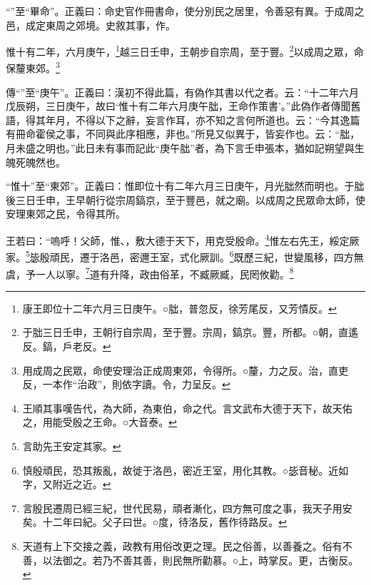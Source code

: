 {\noindent\shu{}\fzkt “”至“畢命”。正義曰：命史官作冊書命，使分別民之居里，令善惡有異。于成周之邑，成定東周之郊境。史敘其事，作。 \par}

惟十有二年，六月庚午，\footnote{康王即位十二年六月三日庚午。○朏，普忽反，徐芳尾反，又芳憒反。}越三日壬申，王朝步自宗周，至于豐。\footnote{于朏三日壬申，王朝行自宗周，至于豐。宗周，鎬京。豐，所都。○朝，直遙反。鎬，戶老反。}以成周之眾，命保釐東郊。\footnote{用成周之民眾，命使安理治正成周東郊，令得所。○釐，力之反。治，直吏反，一本作“治政”，則依字讀。令，力呈反。}


{\noindent\zhuan{}\fzbyks 傳“”至“庚午”。正義曰：漢初不得此篇，有偽作其書以代之者。云：“十二年六月戊辰朔，三日庚午，故曰‘惟十有二年六月庚午朏，王命作策書’。”此偽作者傳聞舊語，得其年月，不得以下之辭，妄言作耳，亦不知之言何所道也。云：“今其逸篇有冊命霍侯之事，不同與此序相應，非也。”所見又似異于，皆妄作也。云：“朏，月未盛之明也。”此日未有事而記此“庚午朏”者，為下言壬申張本，猶如記朔望與生魄死魄然也。 \par}

{\noindent\shu{}\fzkt “惟十”至“東郊”。正義曰：惟即位十有二年六月三日庚午，月光朏然而明也。于朏後三日壬申，王早朝行從宗周鎬京，至于豐邑，就之廟。以成周之民眾命太師，使安理東郊之民，令得其所。 \par}

王若曰：“嗚呼！父師，惟、，敷大德于天下，用克受殷命。\footnote{王順其事嘆告代，為大師，為東伯，命之代。言文武布大德于天下，故天佑之，用能受殷之王命。○大音泰。}惟左右先王，綏定厥家。\footnote{言助先王安定其家。}毖殷頑民，遷于洛邑，密邇王室，式化厥訓。\footnote{慎殷頑民，恐其叛亂，故徙于洛邑，密近王室，用化其教。○毖音秘。近如字，又附近之近。}既歷三紀，世變風移，四方無虞，予一人以寧。\footnote{言殷民遷周已經三紀，世代民易，頑者漸化，四方無可度之事，我天子用安矣。十二年曰紀。父子曰世。○度，待洛反，舊作待路反。}道有升降，政由俗革，不臧厥臧，民罔攸勸。\footnote{天道有上下交接之義，政教有用俗改更之理。民之俗善，以善養之。俗有不善，以法御之。若乃不善其善，則民無所勸慕。○上，時掌反。更，古衡反。}


